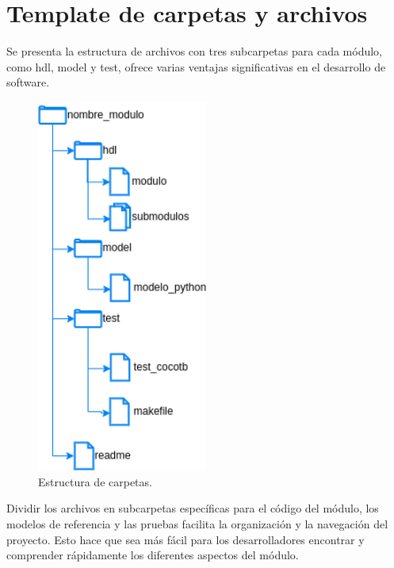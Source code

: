 \chapter{Template de carpetas y archivos} %
\label{AppendixA} %

Se presenta la estructura de archivos con tres subcarpetas para cada módulo, como hdl, model y test, ofrece varias ventajas significativas en el desarrollo de software.

\begin{figure}[h]
  \centering
  \includegraphics[width=0.5\textwidth]{./Figures/files.png}
  \caption{Estructura de carpetas.}\label{fig:files}
\end{figure}

Dividir los archivos en subcarpetas específicas para el código del módulo, los modelos de referencia y las pruebas facilita la organización y la navegación del proyecto. Esto hace que sea más fácil para los desarrolladores encontrar y comprender rápidamente los diferentes aspectos del módulo.

